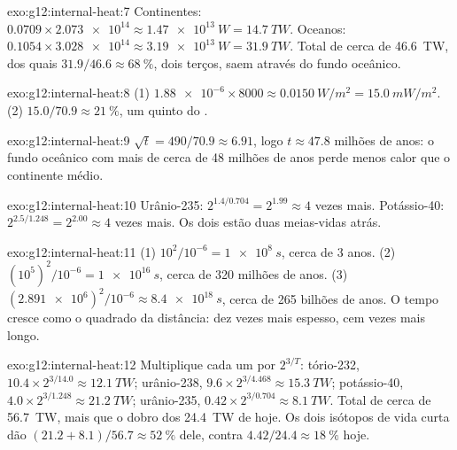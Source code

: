 \begin{solution}{exo:g12:internal-heat:7}
Continentes: $0.0709 \times \num{2.073e14} \approx \qty{1.47e13}{W} =
\qty{14.7}{TW}$. Oceanos: $0.1054 \times \num{3.028e14} \approx
\qty{3.19e13}{W} = \qty{31.9}{TW}$. Total de cerca de \qty{46.6}{TW}, dos
quais $31.9/46.6 \approx \qty{68}{\percent}$, dois terços, saem através do
fundo oceânico.
\end{solution}

\begin{solution}{exo:g12:internal-heat:8}
(1) $\num{1.88e-6} \times 8000 \approx \qty{0.0150}{W/m^2} = \qty{15.0}{mW/m^2}$.
(2) $15.0/70.9 \approx \qty{21}{\percent}$, um quinto do .
\end{solution}

\begin{solution}{exo:g12:internal-heat:9}
$\sqrt{t} = 490/70.9 \approx 6.91$, logo $t \approx 47.8$ milhões de anos: o
fundo oceânico com mais de cerca de 48 milhões de anos perde menos calor que
o continente médio.
\end{solution}

\begin{solution}{exo:g12:internal-heat:10}
Urânio-235: $2^{1.4/0.704} = 2^{1.99} \approx 4$ vezes mais. Potássio-40:
$2^{2.5/1.248} = 2^{2.00} \approx 4$ vezes mais. Os dois estão duas
meias-vidas atrás.
\end{solution}

\begin{solution}{exo:g12:internal-heat:11}
(1) $10^2/10^{-6} = \qty{1e8}{s}$, cerca de 3 anos. (2) $(10^5)^2/10^{-6} =
\qty{1e16}{s}$, cerca de 320 milhões de anos. (3) $(\num{2.891e6})^2/10^{-6}
\approx \qty{8.4e18}{s}$, cerca de 265 bilhões de anos. O tempo cresce como
o quadrado da distância: dez vezes mais espesso, cem vezes mais longo.
\end{solution}

\begin{solution}{exo:g12:internal-heat:12}
Multiplique cada um por $2^{3/T}$: tório-232, $10.4 \times 2^{3/14.0} \approx
\qty{12.1}{TW}$; urânio-238, $9.6 \times 2^{3/4.468} \approx \qty{15.3}{TW}$;
potássio-40, $4.0 \times 2^{3/1.248} \approx \qty{21.2}{TW}$; urânio-235,
$0.42 \times 2^{3/0.704} \approx \qty{8.1}{TW}$. Total de cerca de
\qty{56.7}{TW}, mais que o dobro dos \qty{24.4}{TW} de hoje. Os dois
isótopos de vida curta dão
$(21.2 + 8.1)/56.7 \approx \qty{52}{\percent}$ dele, contra
$4.42/24.4 \approx \qty{18}{\percent}$ hoje.
\end{solution}

